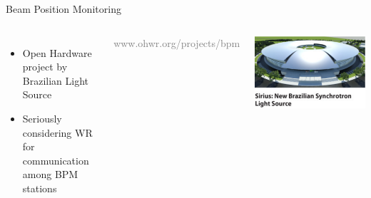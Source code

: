 \documentclass[compress,red]{beamer}
\begin{document}
\begin{frame}{Beam Position Monitoring}

  \begin{columns}[c]

      \begin{itemize}
	\item Open Hardware project by Brazilian Light Source
	\item Seriously considering WR for communication among BPM stations
      \end{itemize}

    \begin{center}
      \textcolor{gray}{www.ohwr.org/projects/bpm}
    \end{center}



    \begin{center}
      \includegraphics[width=1.0\textwidth]{applications/sirius8.pdf}
    \end{center}

  \end{columns}

\end{frame}
\end{document}
